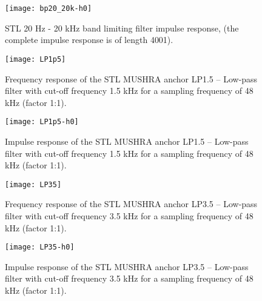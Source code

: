 \begin{figure}[b]
  \begin{center}
 \texttt{[image: bp20\_20k-h0]}
  \end{center}
  \caption{\SF STL 20 Hz - 20 kHz band limiting filter impulse response, (the complete impulse response is of length 4001).
           \label{bp20_20k-48k-ir}
          }
\end{figure}


\begin{figure}[hbtp]
  \begin{center}
 \texttt{[image: LP1p5]}
  \end{center}
  \caption{\SF Frequency response of the STL MUSHRA anchor LP1.5 -- Low-pass filter with cut-off frequency 1.5 kHz for a sampling frequency of 48 kHz (factor 1:1).
           \label{LP1p5-frq}
          }
\end{figure}

\begin{figure}[hbtp]
  \begin{center}
 \texttt{[image: LP1p5-h0]}
  \end{center}
  \caption{\SF Impulse response of the STL MUSHRA anchor LP1.5 -- Low-pass filter with cut-off frequency 1.5 kHz for a sampling frequency of 48 kHz (factor 1:1).
           \label{LP1p5-ir}
          }
\end{figure}


\begin{figure}[hbtp]
  \begin{center}
 \texttt{[image: LP35]}
  \end{center}
  \caption{\SF Frequency response of the STL MUSHRA anchor LP3.5 -- Low-pass filter with cut-off frequency 3.5 kHz for a sampling frequency of 48 kHz (factor 1:1).
           \label{LP35-frq}
          }
\end{figure}

\begin{figure}[hbtp]
  \begin{center}
 \texttt{[image: LP35-h0]}
  \end{center}
  \caption{\SF Impulse response of the STL MUSHRA anchor LP3.5 -- Low-pass filter with cut-off frequency 3.5 kHz for a sampling frequency of 48 kHz (factor 1:1).
           \label{LP35-ir}
          }
\end{figure}


